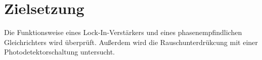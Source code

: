 \section{Zielsetzung}
\label{sec:Zielsetzung}

Die Funktionsweise eines Lock-In-Verstärkers und eines phasenempfindlichen Gleichrichters wird überprüft. Außerdem wird die Rauschunterdrükcung mit einer Photodetektorschaltung untersucht.
